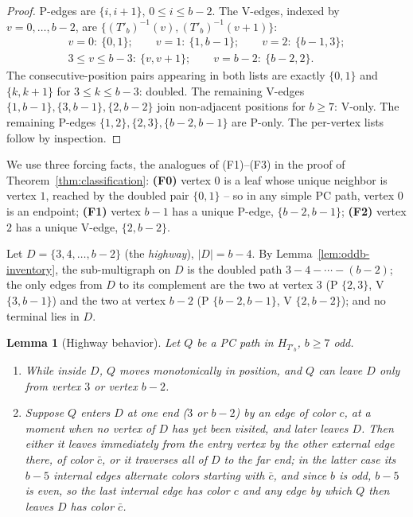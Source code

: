 \documentclass[11pt]{article}
\newtheorem{lemma}[theorem]{Lemma}
\theoremstyle{definition}
\newcommand{\inv}[1]{#1^{-1}}
\begin{document}
\begin{proof}
P-edges are $\{i, i+1\}$, $0 \le i \le b-2$. The V-edges, indexed by
$v = 0, \dots, b-2$, are $\{\inv{(T'_b)}(v), \inv{(T'_b)}(v+1)\}$:
\begin{gather*}
v = 0:\ \{0,1\}; \qquad
v = 1:\ \{1, b{-}1\}; \qquad
v = 2:\ \{b{-}1, 3\}; \\
3 \le v \le b-3:\ \{v, v{+}1\}; \qquad
v = b-2:\ \{b{-}2, 2\}.
\end{gather*}
The consecutive-position pairs appearing in both lists are exactly $\{0,1\}$ and
$\{k,k+1\}$ for $3 \le k \le b-3$: doubled. The remaining V-edges
$\{1,b-1\}, \{3,b-1\}, \{2,b-2\}$ join non-adjacent positions for $b \ge 7$: V-only.
The remaining P-edges $\{1,2\}, \{2,3\}, \{b-2,b-1\}$ are P-only. The per-vertex lists
follow by inspection.
\end{proof}

We use three forcing facts, the analogues of (F1)--(F3) in the proof of
Theorem~\ref{thm:classification}: \textbf{(F0)} vertex $0$ is a leaf whose unique
neighbor is vertex $1$, reached by the doubled pair $\{0,1\}$ -- so in any simple PC
path, vertex $0$ is an endpoint; \textbf{(F1)} vertex $b-1$ has a unique P-edge,
$\{b-2,b-1\}$; \textbf{(F2)} vertex $2$ has a unique V-edge, $\{2,b-2\}$.

Let $D = \{3, 4, \dots, b-2\}$ (the \emph{highway}), $|D| = b - 4$. By
Lemma~\ref{lem:oddb-inventory}, the sub-multigraph on $D$ is the doubled path
$3 - 4 - \cdots - (b-2)$; the only edges from $D$ to its complement are the two at
vertex $3$ (P $\{2,3\}$, V $\{3,b-1\}$) and the two at vertex $b-2$
(P $\{b-2,b-1\}$, V $\{2,b-2\}$); and no terminal lies in $D$.

\begin{lemma}[Highway behavior]\label{lem:oddb-segment}
Let $Q$ be a PC path in $H_{T'_b}$, $b \ge 7$ odd.
\begin{enumerate}
\item[(a)] While inside $D$, $Q$ moves monotonically in position, and $Q$ can leave
$D$ only from vertex $3$ or vertex $b-2$.
\item[(b)] Suppose $Q$ enters $D$ at one end ($3$ or $b-2$) by an edge of color $c$,
at a moment when no vertex of $D$ has yet been visited, and later leaves $D$. Then
either it leaves immediately from the entry vertex by the other external edge there,
of color $\bar c$, or it traverses all of $D$ to the far end; in the latter case its
$b - 5$ internal edges alternate colors starting with $\bar c$, and since $b$ is
\emph{odd}, $b - 5$ is \emph{even}, so the last internal edge has color $c$ and any
edge by which $Q$ then leaves $D$ has color $\bar c$.
\end{enumerate}
\end{lemma}
\end{document}
